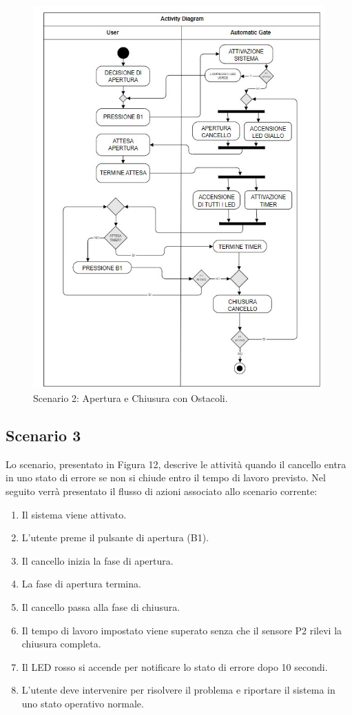 \documentclass[12pt]{article}
\begin{document}
\begin{figure}[h]
    \centering
    \includegraphics[width = 0.7 \textwidth ]{Scenario_2.jpg}
    \caption{Scenario 2: Apertura e Chiusura con Ostacoli.}
    
\end{figure}

\subsection{Scenario 3}
Lo scenario, presentato in Figura 12, descrive le attività quando il cancello entra in uno stato di errore se non si chiude entro il tempo di lavoro previsto. Nel seguito verrà presentato il flusso di azioni associato allo scenario corrente:

\begin{enumerate}
    \item Il sistema viene attivato.
    \item L'utente preme il pulsante di apertura (B1).
    \item Il cancello inizia la fase di apertura.
    \item La fase di apertura termina.
    \item Il cancello passa alla fase di chiusura.
    \item Il tempo di lavoro impostato viene superato senza che il sensore P2 rilevi la chiusura completa.
    \item Il LED rosso si accende per notificare lo stato di errore dopo 10 secondi.
    \item L’utente deve intervenire per risolvere il problema e riportare il sistema in uno stato operativo normale.
\end{enumerate}
\end{document}
